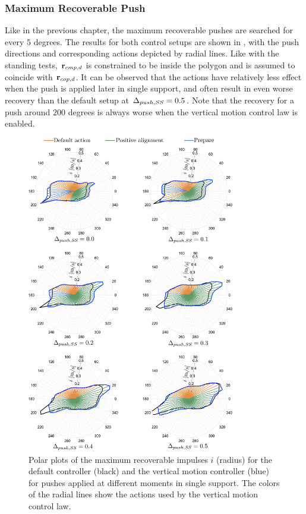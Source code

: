 \subsubsection{Maximum Recoverable Push}
Like in the previous chapter,  the maximum recoverable pushes are searched for every $5$ degrees. The results for both control setups are shown in , with the push directions and corresponding actions depicted by radial lines. Like with the standing tests, $\mathbf{r}_{cmp,d}$ is constrained to be inside the polygon and is assumed to coincide with $\mathbf{r}_{cop,d}$. It can be observed that the actions have relatively less effect when the push is applied later in single support, and often result in even worse recovery than the default setup at $\Delta_{push,SS}=0.5$. Note that the recovery for a push around $200$ degrees is always worse when the vertical motion control law is enabled.
\begin{figure}
     \centering
        \includegraphics[width=0.85\textwidth]{STYLESTUFF/rounActions.png}
    \caption{Polar plots of the maximum recoverable impulses $i$ (radius) for the default controller (black) and the vertical motion controller (blue) for pushes applied at different moments in single support. The colors of the radial lines show the actions used by the vertical motion control law.}
    \label{fig:roundPushActions}
\end{figure}
